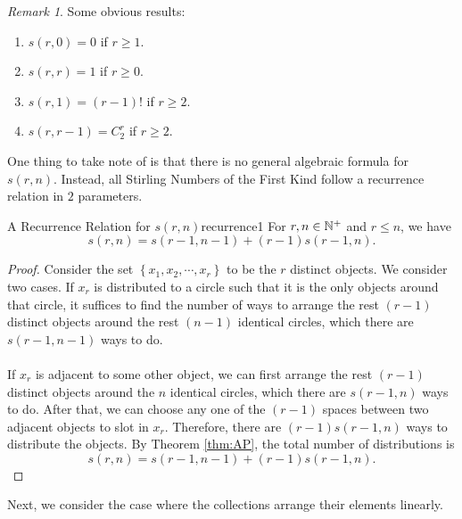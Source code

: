 \documentclass[math]{amznotes}
\theoremstyle{remark}
\newtheorem*{remark}{Remark}
\begin{document}
\begin{notebox}
    \begin{remark}
        Some obvious results:
        \begin{enumerate}
            \item $s(r, 0) = 0$ if $r \geq 1$.
            \item $s(r, r) = 1$ if $r \geq 0$.
            \item $s(r, 1) = (r - 1)!$ if $r \geq 2$.
            \item $s(r, r - 1) = C^r_2$ if $r \geq 2$.
        \end{enumerate}
    \end{remark}
\end{notebox}
One thing to take note of is that there is no general algebraic formula for $s(r, n)$. Instead, all Stirling Numbers of the First Kind follow a recurrence relation in $2$ parameters.
\begin{thmbox}{A Recurrence Relation for $s(r, n)$}{recurrence1}
    For $r, n \in \mathbb{N}^+$ and $r \leq n$, we have
    \begin{equation*}
        s(r, n) = s(r - 1, n - 1) + (r - 1)s(r - 1, n).
    \end{equation*}
    \tcblower   
    \begin{proof}
        Consider the set $\left\{x_1, x_2, \cdots, x_r\right\}$ to be the $r$ distinct objects. We consider two cases. If $x_r$ is distributed to a circle such that it is the only objects around that circle, it suffices to find the number of ways to arrange the rest $(r - 1)$ distinct objects around the rest $(n - 1)$ identical circles, which there are $s(r - 1, n - 1)$ ways to do.
        \\\\
        If $x_r$ is adjacent to some other object, we can first arrange the rest $(r - 1)$ distinct objects around the $n$ identical circles, which there are $s(r - 1, n)$ ways to do. After that, we can choose any one of the $(r - 1)$ spaces between two adjacent objects to slot in $x_r$. Therefore, there are $(r - 1)s(r - 1, n)$ ways to distribute the objects. By Theorem \ref{thm:AP}, the total number of distributions is 
        \begin{equation*}
            s(r, n) = s(r - 1, n - 1) + (r - 1)s(r - 1, n).
        \end{equation*}
    \end{proof}
\end{thmbox}
Next, we consider the case where the collections arrange their elements linearly.
\end{document}
